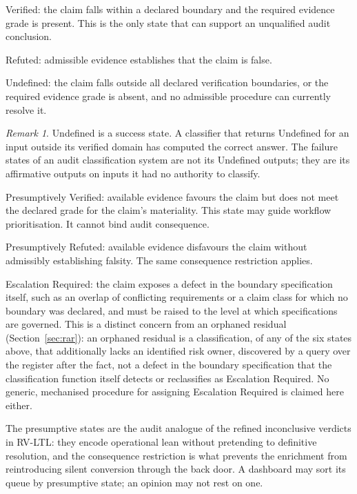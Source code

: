 \documentclass[11pt,a4paper]{article}
\theoremstyle{definition}
\theoremstyle{remark}
\newtheorem{remark}{Remark}[section]
\begin{document}
\textsf{Verified}: the claim falls within a declared boundary and the required evidence grade is present. This is the only state that can support an unqualified audit conclusion.

\textsf{Refuted}: admissible evidence establishes that the claim is false.

\textsf{Undefined}: the claim falls outside all declared verification boundaries, or the required evidence grade is absent, and no admissible procedure can currently resolve it.

\begin{remark}
\label{rem:success}
\textsf{Undefined} is a success state. A classifier that returns \textsf{Undefined} for an input outside its verified domain has computed the correct answer. The failure states of an audit classification system are not its \textsf{Undefined} outputs; they are its affirmative outputs on inputs it had no authority to classify.
\end{remark}

\textsf{Presumptively Verified}: available evidence favours the claim but does not meet the declared grade for the claim's materiality. This state may guide workflow prioritisation. It cannot bind audit consequence.

\textsf{Presumptively Refuted}: available evidence disfavours the claim without admissibly establishing falsity. The same consequence restriction applies.

\textsf{Escalation Required}: the claim exposes a defect in the boundary specification itself, such as an overlap of conflicting requirements or a claim class for which no boundary was declared, and must be raised to the level at which specifications are governed. This is a distinct concern from an orphaned residual (Section~\ref{sec:rar}): an orphaned residual is a classification, of any of the six states above, that additionally lacks an identified risk owner, discovered by a query over the register after the fact, not a defect in the boundary specification that the classification function itself detects or reclassifies as \textsf{Escalation Required}. No generic, mechanised procedure for assigning \textsf{Escalation Required} is claimed here either.

The presumptive states are the audit analogue of the refined inconclusive verdicts in RV-LTL: they encode operational lean without pretending to definitive resolution, and the consequence restriction is what prevents the enrichment from reintroducing silent conversion through the back door. A dashboard may sort its queue by presumptive state; an opinion may not rest on one.
\end{document}
